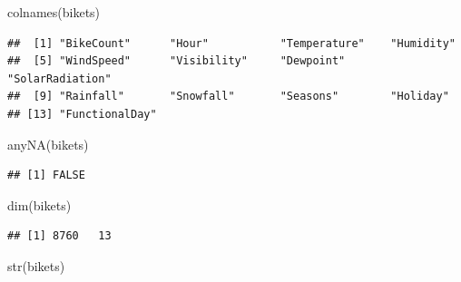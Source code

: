 \documentclass[
]{article}
\newenvironment{Shaded}{\begin{snugshade}}{\end{snugshade}}
\newcommand{\FunctionTok}[1]{\textcolor[rgb]{0.00,0.00,0.00}{#1}}
\newcommand{\NormalTok}[1]{#1}
\begin{document}
\begin{Shaded}
\begin{Highlighting}[]
\FunctionTok{colnames}\NormalTok{(bikets)}
\end{Highlighting}
\end{Shaded}

\begin{verbatim}
##  [1] "BikeCount"      "Hour"           "Temperature"    "Humidity"      
##  [5] "WindSpeed"      "Visibility"     "Dewpoint"       "SolarRadiation"
##  [9] "Rainfall"       "Snowfall"       "Seasons"        "Holiday"       
## [13] "FunctionalDay"
\end{verbatim}

\begin{Shaded}
\begin{Highlighting}[]
\FunctionTok{anyNA}\NormalTok{(bikets)}
\end{Highlighting}
\end{Shaded}

\begin{verbatim}
## [1] FALSE
\end{verbatim}

\begin{Shaded}
\begin{Highlighting}[]
\FunctionTok{dim}\NormalTok{(bikets)}
\end{Highlighting}
\end{Shaded}

\begin{verbatim}
## [1] 8760   13
\end{verbatim}

\begin{Shaded}
\begin{Highlighting}[]
\FunctionTok{str}\NormalTok{(bikets)}
\end{Highlighting}
\end{Shaded}
\end{document}
